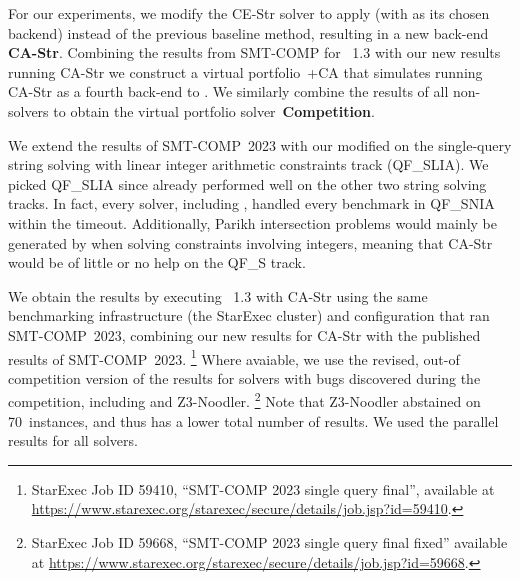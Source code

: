 For our experiments, we modify the CE-Str solver to apply \Catra{}
 (with \Calculus{} as its chosen backend)
instead of the previous baseline method, resulting in a new back-end
\textbf{CA-Str}. Combining the results from SMT-COMP for \Ostrich{}~1.3 
with our new results running CA-Str we construct a virtual 
portfolio~\Ostrich{}+CA that simulates running CA-Str as a fourth
back-end to \Ostrich{}. We similarly combine the results of all non-\Ostrich{} solvers
to obtain the virtual portfolio solver~\textbf{Competition}.

%
%

We extend the results of SMT-COMP~2023 with our modified \Ostrich{}
on the single-query string solving with linear integer arithmetic constraints
track (QF\_SLIA). We picked QF\_SLIA since
\Ostrich{} already performed well on the other two string solving tracks. In fact,
every solver, including \Ostrich{}, handled every benchmark in QF\_SNIA within the timeout.
Additionally, Parikh intersection problems would mainly be generated by \Ostrich{} when
solving constraints involving integers, meaning that CA-Str would be of little or no
help on the QF\_S track.

We obtain the results by executing \Ostrich{}~1.3 with CA-Str using
the same benchmarking infrastructure (the StarExec cluster)
and configuration that ran SMT-COMP~2023, combining our new results for CA-Str with the
published results of SMT-COMP~2023.
\footnote{StarExec Job ID 59410, \enquote{SMT-COMP 2023 single query final}, 
available at \url{https://www.starexec.org/starexec/secure/details/job.jsp?id=59410}.} 
Where avaiable, we use the revised, out-of
competition version of the results for solvers with bugs discovered during
the competition, including \Ostrich{} and Z3-Noodler. 
\footnote{StarExec Job ID 59668, \enquote{SMT-COMP 2023 single query final fixed} available at
\url{https://www.starexec.org/starexec/secure/details/job.jsp?id=59668}.}
Note that Z3-Noodler abstained on 70~instances, and thus has a lower total number of results.
We used the parallel results for all solvers.

